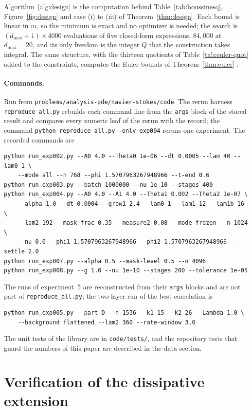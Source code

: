 \documentclass[11pt]{article}
\theoremstyle{remark}
\newcommand{\ev}[1]{\hspace{0.2em}{\small\textsf{[#1]}}}
\newcommand{\fp}[1]{\nolinkurl{#1}}
\begin{document}
Algorithm~\ref{alg:design} is the computation behind Table~\ref{tab:boussinesq}, Figure~\ref{fig:design} and
case (i) to (iii) of Theorem~\ref{thm:design}. Each bound is linear in $m$, so the minimum is exact and no
optimizer is needed; the search is $(d_{\max}+1)\times4000$ evaluations of five closed-form expressions, $84{,}000$ at
$d_{\max}=20$, and its only freedom is the integer $Q$ that the construction takes integral. The same
structure, with the thirteen quotients of Table~\ref{tab:euler-quot} added to the constraints, computes the
Euler bounds of Theorem~\ref{thm:euler} \ev{D}.

\paragraph{Commands.} Run from \fp{problems/analysis-pde/navier-stokes/code}. The rerun harness
\fp{reproduce_all.py} rebuilds each command line from the \fp{args} block of the stored result
and compares every numeric leaf of the rerun with the record; the command
\texttt{python reproduce\_all.py --only exp004} reruns one experiment. The recorded commands are
{\footnotesize
\begin{verbatim}
python run_exp002.py --A0 4.0 --Theta0 1e-06 --dt 0.0005 --lam 40 --lam0 1 \
    --mode all --n 768 --phi 1.5707963267948966 --t-end 0.6
python run_exp003.py --batch 1000000 --nu 1e-10 --stages 400
python run_exp004.py --A0 4.0 --A1 4.0 --Theta1 0.002 --Theta2 1e-07 \
    --alpha 1.0 --dt 0.0004 --grow1 2.4 --lam0 1 --lam1 12 --lam1b 16 \
    --lam2 192 --mask-frac 0.35 --measure2 0.08 --mode frozen --n 1024 \
    --nu 0.0 --phi1 1.5707963267948966 --phi2 1.5707963267948966 --settle 2.0
python run_exp007.py --alpha 0.5 --mask-level 0.5 --n 4096
python run_exp008.py --g 1.0 --nu 1e-10 --stages 200 --tolerance 1e-05
\end{verbatim}
}
The runs of experiment~5 are reconstructed from their \fp{args} blocks and are not part of
\fp{reproduce_all.py}; the two-layer run of the best correlation is
{\footnotesize
\begin{verbatim}
python run_exp005.py --part D --n 1536 --k1 15 --k2 26 --Lambda 1.0 \
    --background flattened --lam2 360 --rate-window 3.0
\end{verbatim}
}
The unit tests of the library are in \fp{code/tests/}, and the repository tests that guard the
numbers of this paper are described in the data section.

\section{Verification of the dissipative extension}\label{sec:validation}
\end{document}
